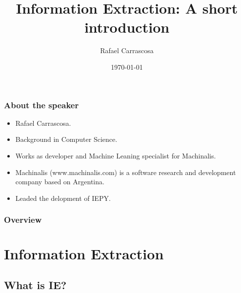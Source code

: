 \documentclass{beamer}
\title[Information Extraction]{Information Extraction: A short introduction}
\author{Rafael Carrascosa}
\institute[\href{http://www.machinalis.com/}{Machinalis}] %
{
\href{http://www.machinalis.com/}{Machinalis} \\ %
\medskip
\textit{rcarrascosa@machinalis.com} %
}
\date{\today} %
\begin{document}
\begin{frame}
\titlepage %
\end{frame}

\begin{frame}
\frametitle{About the speaker}
\begin{itemize}
\item Rafael Carrascosa.
\item Background in Computer Science.
\item Works as developer and Machine Leaning specialist for Machinalis.
\item Machinalis (www.machinalis.com) is a software research and development company based on Argentina.
\item Leaded the delopment of IEPY.
\end{itemize}
\end{frame}


\begin{frame}
\frametitle{Overview} %
\tableofcontents %
\end{frame}


\section{Information Extraction}


\subsection{What is IE?}
\end{document}
